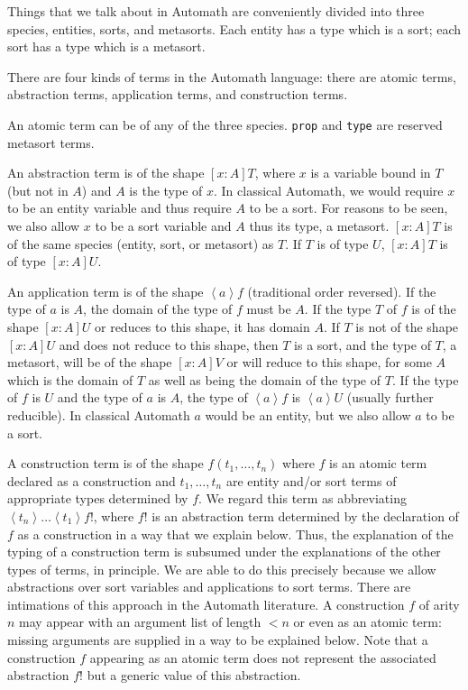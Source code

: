 \documentclass{article}
\begin{document}
Things that we talk about in Automath are conveniently divided into three species, entities, sorts, and metasorts.  Each entity has a type which is a sort;  each sort has a type which is a metasort.

There are four kinds of terms in the Automath language:  there are atomic terms, abstraction terms, application terms, and construction terms.

An atomic term can be of any of the three species.  {\tt prop} and {\tt type} are reserved metasort terms.

An abstraction term is of the shape $[x:A]T$, where $x$ is a variable bound in $T$ (but not in $A$) and $A$ is the type of $x$.  In classical Automath, we would require $x$ to be an entity variable and thus require $A$ to be a sort.  For reasons to be seen, we also allow $x$ to be a sort variable and $A$ thus its type, a metasort.  $[x:A]T$ is of the same species (entity, sort, or metasort) as $T$.  If $T$ is of type $U$,
$[x:A]T$ is of type $[x:A]U$.

An application term is of the shape $\left<a\right>f$ (traditional order reversed).  If the type of $a$ is $A$, the domain of the type of $f$ must be $A$.  If the type $T$ of $f$  is of the shape $[x:A]U$ or reduces to this shape, it has domain $A$.  If $T$ is not of the shape $[x:A]U$ and does not reduce to this shape, then $T$ is a sort, and the type of $T$, a metasort, will be of the shape $[x:A]V$ or will reduce to this shape, for some $A$ which is the domain of $T$ as well as being the domain of the type of $T$.  If the type of $f$ is $U$ and the type of $a$ is $A$, the type of $\left<a\right>f$ is $\left<a\right>U$ (usually further reducible).  In classical Automath $a$ would be an entity, but we also  allow $a$ to be a sort.

A construction term is of the shape $f(t_1,\ldots,t_n)$ where $f$ is an atomic term declared as a construction and $t_1,\ldots,t_n$ are entity and/or sort terms of appropriate types determined by $f$.  We regard this term as abbreviating $\left<t_n\right>\ldots\left<t_1\right>f!$, where $f!$ is an abstraction term determined by the declaration of $f$ as a construction in a way that we explain below.  Thus, the explanation of the typing of a construction term is subsumed under the explanations of the other types of terms, in principle.  We are able to do this precisely because we allow abstractions over sort variables and applications to sort terms.  There are intimations of this approach in the Automath literature.  A construction $f$ of arity $n$ may appear with an argument list of length $<n$ or even as an atomic term:  missing arguments are supplied in a way to be explained below.  Note that a construction $f$ appearing as an atomic term does not represent the associated abstraction $f!$ but a generic value of this abstraction.
\end{document}
